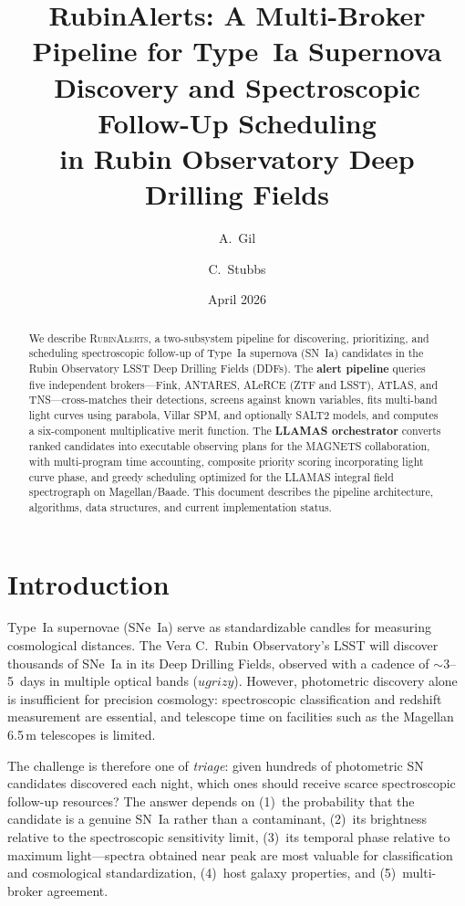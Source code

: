 \documentclass[11pt,letterpaper]{article}
\title{\textbf{RubinAlerts}: A Multi-Broker Pipeline for Type~Ia Supernova\\
Discovery and Spectroscopic Follow-Up Scheduling\\
in Rubin Observatory Deep Drilling Fields}
\author{A.~Gil \and C.~Stubbs}
\date{April 2026}
\begin{document}
\maketitle

\begin{abstract}
We describe \textsc{RubinAlerts}, a two-subsystem pipeline for
discovering, prioritizing, and scheduling spectroscopic follow-up of
Type~Ia supernova (SN~Ia) candidates in the Rubin Observatory LSST
Deep Drilling Fields (DDFs).  The \textbf{alert pipeline} queries five
independent brokers---Fink, ANTARES, ALeRCE (ZTF and LSST), ATLAS,
and TNS---cross-matches their detections, screens against known
variables, fits multi-band light curves using parabola, Villar SPM,
and optionally SALT2 models, and computes a six-component
multiplicative merit function.  The \textbf{LLAMAS orchestrator}
converts ranked candidates into executable observing plans for the
MAGNETS collaboration, with multi-program time accounting, composite
priority scoring incorporating light curve phase, and greedy
scheduling optimized for the LLAMAS integral field spectrograph on
Magellan/Baade.  This document describes the pipeline architecture,
algorithms, data structures, and current implementation status.
\end{abstract}

\tableofcontents
\newpage

\section{Introduction}
\label{sec:intro}

Type~Ia supernovae (SNe~Ia) serve as standardizable candles for
measuring cosmological distances.  The Vera C.\ Rubin Observatory's
LSST will discover thousands of SNe~Ia in its Deep Drilling Fields,
observed with a cadence of $\sim$3--5~days in multiple optical bands
($ugrizy$).  However, photometric discovery alone is insufficient for
precision cosmology: spectroscopic classification and redshift
measurement are essential, and telescope time on facilities such as the
Magellan 6.5\,m telescopes is limited.

The challenge is therefore one of \emph{triage}: given hundreds of
photometric SN candidates discovered each night, which ones should
receive scarce spectroscopic follow-up resources?  The answer depends on
(1)~the probability that the candidate is a genuine SN~Ia rather than a
contaminant, (2)~its brightness relative to the spectroscopic
sensitivity limit, (3)~its temporal phase relative to maximum
light---spectra obtained near peak are most valuable for classification
and cosmological standardization, (4)~host galaxy properties, and
(5)~multi-broker agreement.
\end{document}

